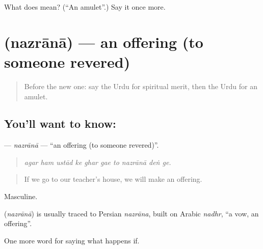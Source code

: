 \begin{tcolorbox}[breakable,colback=teal!4,colframe=teal!35!black,title={Before you move on}]
What does  mean? (\textquotedblleft{}An amulet\textquotedblright{}.) Say it once more.
\end{tcolorbox}
\section[\texorpdfstring{\ur{نذرانہ} (nazrānā)}{نذرانہ (nazrānā)}]{ (nazrānā) — an offering (to someone revered)}

\label{lesson:UR-C528-nazrana}



\begin{quote}
Before the new one: say the Urdu for spiritual merit, then the Urdu for an amulet.
\end{quote}

\subsection*{You'll want to know: }
\textbf{} — \emph{nazrānā} — \textquotedblleft{}an offering (to someone revered)\textquotedblright{}.

\begin{quote}
         
\end{quote}

\begin{quote}
\emph{agar ham ustād ke ghar gae to nazrānā deṅ ge.}
\end{quote}

\begin{quote}
If we go to our teacher's house, we will make an offering.
\end{quote}

Masculine.

\begin{cousinweb}
\textbf{} (\emph{nazrānā}) is usually traced to Persian \emph{nazrāna}, built on Arabic \emph{nadhr}, \textquotedblleft{}a vow, an offering\textquotedblright{}.
\end{cousinweb}

\begin{grammarlens}[title={What you've built}]
One more word for saying what happens if.
\end{grammarlens}

